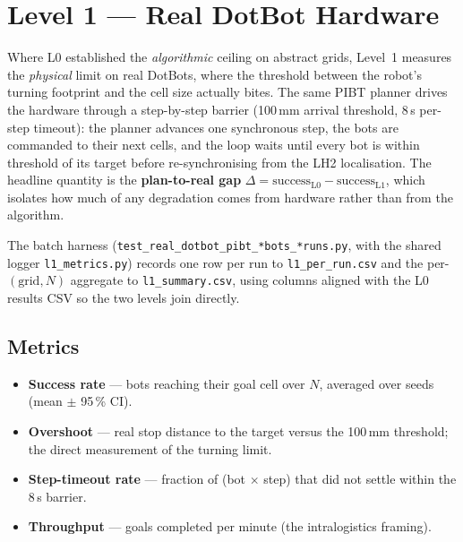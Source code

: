 
\section{Level 1 --- Real DotBot Hardware}

Where L0 established the \emph{algorithmic} ceiling on abstract grids, Level~1
measures the \emph{physical} limit on real DotBots, where the threshold between the
robot's turning footprint and the cell size actually bites. The same PIBT planner
drives the hardware through a step-by-step barrier (100\,mm arrival threshold, 8\,s
per-step timeout): the planner advances one synchronous step, the bots are commanded
to their next cells, and the loop waits until every bot is within threshold of its
target before re-synchronising from the LH2 localisation. The headline quantity is the
\textbf{plan-to-real gap} $\Delta = \text{success}_{\text{L0}} - \text{success}_{\text{L1}}$,
which isolates how much of any degradation comes from hardware rather than from the
algorithm.

The batch harness (\texttt{test\_real\_dotbot\_pibt\_*bots\_*runs.py}, with the shared
logger \texttt{l1\_metrics.py}) records one row per run to \texttt{l1\_per\_run.csv} and
the per-$(\text{grid}, N)$ aggregate to \texttt{l1\_summary.csv}, using columns aligned
with the L0 results CSV so the two levels join directly.

\subsection{Metrics}

\begin{itemize}
    \item \textbf{Success rate} --- bots reaching their goal cell over $N$, averaged
          over seeds (mean $\pm$ 95\,\% CI).
    \item \textbf{Overshoot} --- real stop distance to the target versus the 100\,mm
          threshold; the direct measurement of the turning limit.
    \item \textbf{Step-timeout rate} --- fraction of (bot $\times$ step) that did not
          settle within the 8\,s barrier.
    \item \textbf{Throughput} --- goals completed per minute (the intralogistics framing).
\end{itemize}

